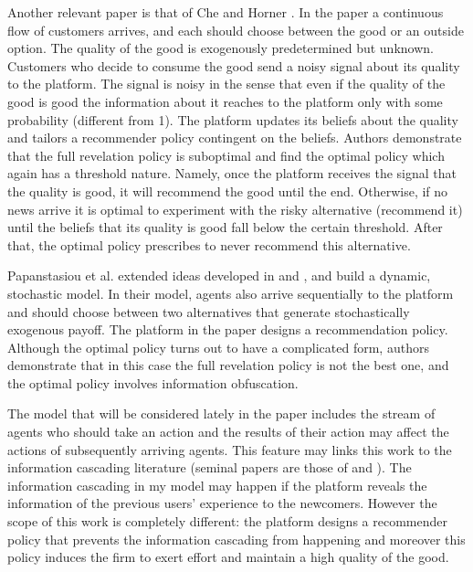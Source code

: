 \documentclass[a4paper]{article}
\begin{document}
	
	
	
	Another relevant paper is that of Che and Horner \cite{che2015}. In the paper a continuous flow of customers arrives, and each should choose between the good or an outside option. The quality of the good is exogenously predetermined but unknown. Customers who decide to consume the good send a noisy signal about its quality to the platform. The signal is noisy in the sense that even if the quality of the good is good the information about it reaches to the platform only with some probability (different from 1). The platform updates its beliefs about the quality and tailors a recommender policy contingent on the beliefs. Authors demonstrate that the full revelation policy is suboptimal and find the optimal policy which again has a threshold nature. Namely, once the platform receives the signal that the quality is good, it will recommend the good until the end. Otherwise, if no news arrive it is optimal to experiment with the risky alternative (recommend it) until the beliefs that its quality is good fall below the certain threshold. After that, the optimal policy prescribes to never recommend this alternative.
	
	
	
	Papanstasiou et al. \cite{papanastasiou2017} extended ideas developed in \cite{kremer2014} and \cite{che2015}, and build a dynamic, stochastic model. In their model, agents also arrive sequentially to the platform and should choose between two alternatives that generate stochastically exogenous payoff. The platform in the paper designs a recommendation policy. Although the optimal policy turns out to have a complicated form, authors demonstrate that in this case the full revelation policy is not the best one, and the optimal policy involves information obfuscation.
	
	
	
	The model that will be considered lately in the paper includes the stream of agents who should take an action and the results of their action may affect the actions of subsequently arriving agents. This feature may links this work to the information cascading literature (seminal papers are those of \cite{banerjee1992simple} and \cite{bikhchandani1992theory}). The information cascading in my model may happen if the platform reveals the information of the previous users' experience to the newcomers. However the scope of this work is completely different: the platform designs a recommender policy that prevents the information cascading from happening and moreover this policy induces the firm to exert effort and maintain a high quality of the good.
	
\end{document}
